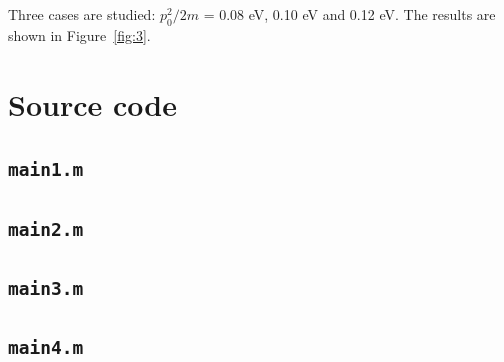 Three cases are studied: $p_0^2/2m$ = 0.08 eV, 0.10 eV and 0.12 eV. The results are shown in Figure~\ref{fig:3}.








\appendix
\section{Source code}

\subsection{\texttt{main1.m}}


\subsection{\texttt{main2.m}}


\subsection{\texttt{main3.m}}


\subsection{\texttt{main4.m}}



